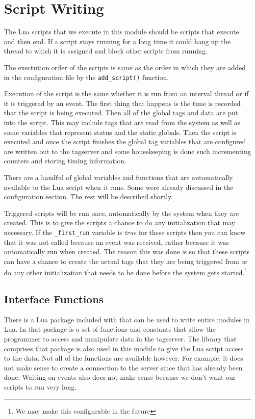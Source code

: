 \section{Script Writing}

The Lua scripts that we execute in this module should be scripts that execute and then
end.  If a script stays running for a long time it could hang up the thread to which it
is assigned and block other scripts from running.

The exectution order of the scripts is same as the order in which they are added in the
configuration file by the \texttt{add\_script()} function.

Execution of the script is the same whether it is run from an interval thread or if
it is triggered by an event.  The first thing that happens is the time is
recorded
that the script is being executed.  Then all of the global
tags and data are put into the script.  This may include tags that are read from the
system as well as some variables that represent status and the static globals.
Then the script is executed and once the script finishes the global tag variables
that are configured are written out to the tagserver and some housekeeping is done such
incrementing counters and storing timing information.

There are a handful of global variables and functions that are automatically available
to the Lua script when it runs.  Some were already discussed in the configuration
section.  The rest will be described shortly.

Triggered scripts will be run once, automatically by the system when they
are created.  This is to give the scripts a chance to do any initialization
that may necessary.  If the \texttt{\_first\_run} variable is \textit{true} for
these scripts then you can know that it was not called because an event
was received, rather because it was automatically run when created.  The
reason this was done is so that these scripts can have a chance to create
the actual tags that they are being triggered from or do any other
initialization that needs to be done before the system gets
started.\footnote{We may make this configurable in the future}

\subsection{\opendax Interface Functions}

There is a Lua package included with \opendax that can be used to write entire \opendax
modules in Lua.
In that package is a set of functions and constants that allow the programmer to access
and manipulate data in the tagserver.  The library that comprises that package is also
used in this module to give the Lua script access to the \opendax data.  Not all of
the functions are available however.  For example, it does not make sense to create
a connection to the server since that has already been done.  Waiting on events also
does not make sense because we don't want our scripts to run very long.

